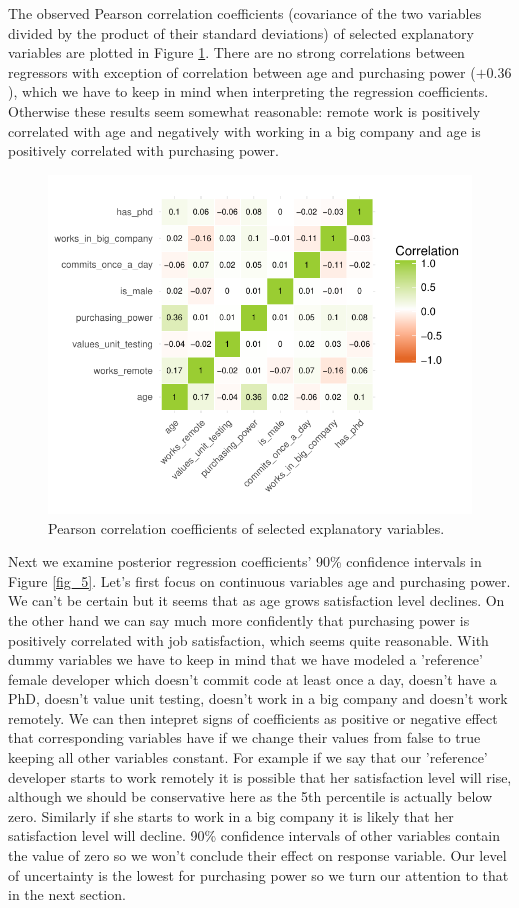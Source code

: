 \documentclass{article}
\begin{document}
The observed Pearson correlation coefficients (covariance of the two variables divided by the product of their standard deviations) of selected explanatory variables are plotted in Figure \ref{fig_4}. There are no strong correlations between regressors with exception of correlation between age and purchasing power ($+0.36$), which we have to keep in mind when interpreting the regression coefficients. Otherwise these results seem somewhat reasonable: remote work is positively correlated with age and negatively with working in a big company and age is positively correlated with purchasing power.


\begin{figure}[H]
\centering
\includegraphics{report-019}
\caption{Pearson correlation coefficients of selected explanatory variables.}\label{fig_4}
\end{figure}

Next we examine posterior regression coefficients' 90\% confidence intervals in Figure \ref{fig_5}. Let's first focus on continuous variables age and purchasing power. We can't be certain but it seems that as age grows satisfaction level declines. On the other hand we can say much more confidently that purchasing power is positively correlated with job satisfaction, which seems quite reasonable. With dummy variables we have to keep in mind that we have modeled a 'reference' female developer which doesn't commit code at least once a day, doesn't have a PhD, doesn't value unit testing, doesn't work in a big company and doesn't work remotely. We can then intepret signs of coefficients as positive or negative effect that corresponding variables have if we change their values from false to true keeping all other variables constant. For example if we say that our 'reference' developer starts to work remotely it is possible that her satisfaction level will rise, although we should be conservative here as the 5th percentile is actually below zero. Similarly if she starts to work in a big company it is likely that her satisfaction level will decline. 90\% confidence intervals of other variables contain the value of zero so we won't conclude their effect on response variable. Our level of uncertainty is the lowest for purchasing power so we turn our attention to that in the next section.
\end{document}
